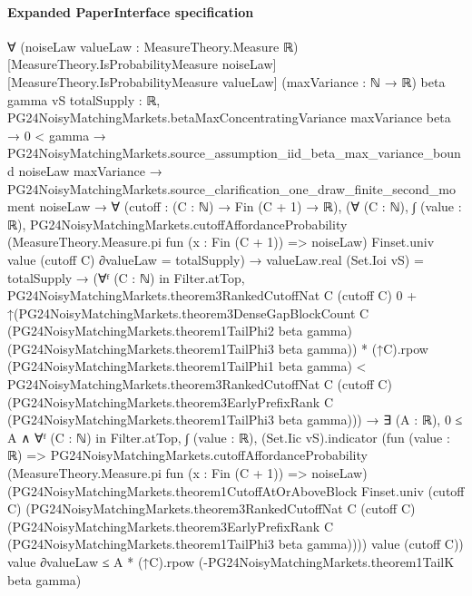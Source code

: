 \documentclass[10pt]{article}
\begin{document}
\paragraph{Expanded PaperInterface specification}
\begin{ReviewVerbatim}
∀ (noiseLaw valueLaw : MeasureTheory.Measure ℝ) [MeasureTheory.IsProbabilityMeasure noiseLaw]
  [MeasureTheory.IsProbabilityMeasure valueLaw] (maxVariance : ℕ → ℝ) {beta gamma vS totalSupply : ℝ},
  PG24NoisyMatchingMarkets.betaMaxConcentratingVariance maxVariance beta →
    0 < gamma →
      PG24NoisyMatchingMarkets.source_assumption_iid_beta_max_variance_bound noiseLaw maxVariance →
        PG24NoisyMatchingMarkets.source_clarification_one_draw_finite_second_moment noiseLaw →
          ∀ (cutoff : (C : ℕ) → Fin (C + 1) → ℝ),
            (∀ (C : ℕ),
                ∫ (value : ℝ),
                    PG24NoisyMatchingMarkets.cutoffAffordanceProbability
                      (MeasureTheory.Measure.pi fun (x : Fin (C + 1)) => noiseLaw) Finset.univ value
                      (cutoff C) ∂valueLaw =
                  totalSupply) →
              valueLaw.real (Set.Ioi vS) = totalSupply →
                (∀ᶠ (C : ℕ) in Filter.atTop,
                    PG24NoisyMatchingMarkets.theorem3RankedCutoffNat C (cutoff C) 0 +
                        ↑(PG24NoisyMatchingMarkets.theorem3DenseGapBlockCount C
                              (PG24NoisyMatchingMarkets.theorem1TailPhi2 beta gamma)
                              (PG24NoisyMatchingMarkets.theorem1TailPhi3 beta gamma)) *
                          (↑C).rpow (PG24NoisyMatchingMarkets.theorem1TailPhi1 beta gamma) <
                      PG24NoisyMatchingMarkets.theorem3RankedCutoffNat C (cutoff C)
                        (PG24NoisyMatchingMarkets.theorem3EarlyPrefixRank C
                          (PG24NoisyMatchingMarkets.theorem1TailPhi3 beta gamma))) →
                  ∃ (A : ℝ),
                    0 ≤ A ∧
                      ∀ᶠ (C : ℕ) in Filter.atTop,
                        ∫ (value : ℝ),
                            (Set.Iic vS).indicator
                              (fun (value : ℝ) =>
                                PG24NoisyMatchingMarkets.cutoffAffordanceProbability
                                  (MeasureTheory.Measure.pi fun (x : Fin (C + 1)) => noiseLaw)
                                  (PG24NoisyMatchingMarkets.theorem1CutoffAtOrAboveBlock Finset.univ (cutoff C)
                                    (PG24NoisyMatchingMarkets.theorem3RankedCutoffNat C (cutoff C)
                                      (PG24NoisyMatchingMarkets.theorem3EarlyPrefixRank C
                                        (PG24NoisyMatchingMarkets.theorem1TailPhi3 beta gamma))))
                                  value (cutoff C))
                              value ∂valueLaw ≤
                          A * (↑C).rpow (-PG24NoisyMatchingMarkets.theorem1TailK beta gamma)
\end{ReviewVerbatim}
\end{document}
